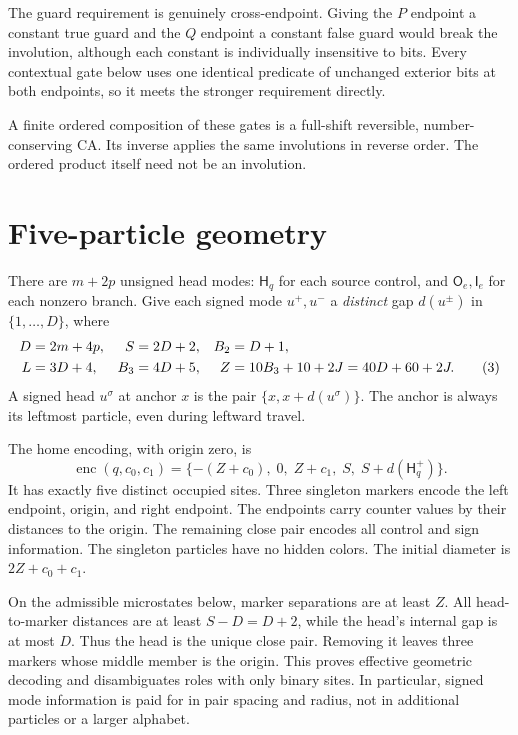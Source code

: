 \documentclass[11pt,a4paper]{article}
\numberwithin{equation}{section}
\newcommand{\enc}{\operatorname{enc}}\newcommand{\Enc}{\operatorname{Enc}}
\newcommand{\Hh}{\mathsf H}\newcommand{\Oo}{\mathsf O}\newcommand{\Ii}{\mathsf I}\newcommand{\HH}{\mathsf H}
\begin{document}
The guard requirement is genuinely cross-endpoint. Giving the $P$ endpoint
a constant true guard and the $Q$ endpoint a constant false guard would break
the involution, although each constant is individually insensitive to bits.
Every contextual gate below uses one identical predicate of unchanged exterior
bits at both endpoints, so it meets the stronger requirement directly.

A finite ordered composition of these gates is a full-shift reversible,
number-conserving CA. Its inverse applies the same involutions in reverse
order. The ordered product itself need not be an involution.

\section{Five-particle geometry}\label{fpa:sec:geometry}
There are $m+2p$ unsigned head modes: $\Hh_q$ for each source control, and
$\Oo_e,\Ii_e$ for each nonzero branch. Give each signed mode $u^+,u^-$ a
\emph{distinct} gap $d(u^\pm)$ in $\{1,\ldots,D\}$, where
\begin{align}
 D&=2m+4p, & S&=2D+2, & B_2&=D+1,\notag\\
 L&=3D+4, & B_3&=4D+5, & Z&=10B_3+10+2J=40D+60+2J. \tag{3}\label{fpa:eq:constants}
\end{align}
A signed head $u^\sigma$ at anchor $x$ is the pair $\{x,x+d(u^\sigma)\}$.
The anchor is always its leftmost particle, even during leftward travel.

The home encoding, with origin zero, is
\[
 \enc(q,c_0,c_1)=
 \{-(Z+c_0),\;0,\;Z+c_1,\;S,\;S+d(\Hh_q^+)\}.        \tag{4}\label{fpa:eq:encoding}
\]
It has exactly five distinct occupied sites. Three singleton markers encode
the left endpoint, origin, and right endpoint. The endpoints carry counter
values by their distances to the origin. The remaining close pair encodes all
control and sign information. The singleton particles have no hidden colors.
The initial diameter is $2Z+c_0+c_1$.

On the admissible microstates below, marker separations are at least $Z$.
All head-to-marker distances are at least $S-D=D+2$, while the head's internal
gap is at most $D$. Thus the head is the unique close pair. Removing it leaves
three markers whose middle member is the origin. This proves effective
geometric decoding and disambiguates roles with only binary sites. In
particular, signed mode information is paid for in pair spacing and radius,
not in additional particles or a larger alphabet.
\end{document}
